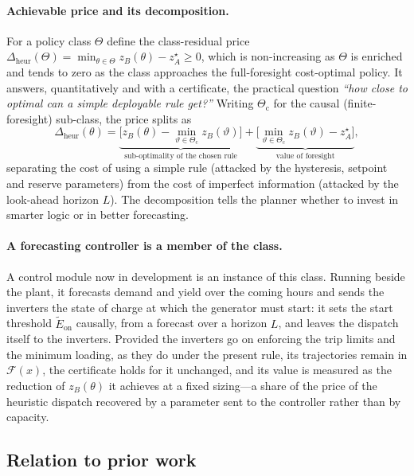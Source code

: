 \documentclass[11pt,a4paper]{article}
\theoremstyle{plain}
\theoremstyle{definition}
\begin{document}
\paragraph{Achievable price and its decomposition.} For a policy class $\Theta$ define the
class-residual price
$\Delta_{\mathrm{heur}}(\Theta)=\min_{\theta\in\Theta} z_B(\theta)-z_A^\star\ge0$, which is
non-increasing as $\Theta$ is enriched and tends to zero as the class approaches the
full-foresight cost-optimal policy. It answers, quantitatively and with a certificate, the
practical question \emph{``how close to optimal can a simple deployable rule get?''}
Writing $\Theta_{\mathrm{c}}$ for the causal (finite-foresight) sub-class, the price splits
as
\begin{equation}
  \Delta_{\mathrm{heur}}(\theta)
  = \underbrace{\big[z_B(\theta)-\min_{\vartheta\in\Theta_{\mathrm{c}}}z_B(\vartheta)\big]}
      _{\text{sub-optimality of the chosen rule}}
  + \underbrace{\big[\min_{\vartheta\in\Theta_{\mathrm{c}}}z_B(\vartheta)-z_A^\star\big]}
      _{\text{value of foresight}} ,
\end{equation}
separating the cost of using a simple rule (attacked by the hysteresis, setpoint and
reserve parameters) from the cost of imperfect information (attacked by the look-ahead
horizon $L$). The decomposition tells the planner whether to invest in smarter logic or in
better forecasting.

\paragraph{A forecasting controller is a member of the class.} A control module now in
development is an instance of this class. Running beside the plant, it forecasts demand and
yield over the coming hours and sends the inverters the state of charge at which the
generator must start: it sets the start threshold $\tilde E_{\mathrm{on}}$ causally, from a
forecast over a horizon $L$, and leaves the dispatch itself to the inverters. Provided the
inverters go on enforcing the trip limits and the minimum loading, as they do under the
present rule, its trajectories remain in $\mathcal{F}(x)$, the certificate holds for it
unchanged, and its value is measured as the reduction of $z_B(\theta)$ it achieves at a
fixed sizing---a share of the price of the heuristic dispatch recovered by a parameter sent
to the controller rather than by capacity.

\subsection{Relation to prior work}
\end{document}
